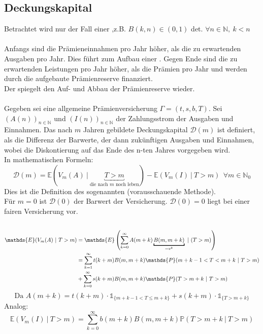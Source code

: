 \subsection{Deckungskapital}
\label{sub:deckungskapital}
Betrachtet wird nur der Fall einer ,z.B. $B(k,n) \in (0,1)$ det. $\forall n \in \mathds{N},~k<n$\\
\\
Anfangs sind die Prämieneinnahmen pro Jahr höher, als die zu erwartenden Ausgaben pro Jahr. Dies führt zum Aufbau einer . Gegen Ende sind die zu erwartenden Leistungen pro Jahr höher, als die Prämien pro Jahr und werden durch die aufgebaute Prämienreserve finanziert.\\
Der  spiegelt den Auf- und Abbau der Prämienreserve wieder.\\
\\
Gegeben sei eine allgemeine Prämienversicherung $\Gamma=(t,s,b,T)$. Sei $(A(n))_{n\in \mathds{N}}$ und $(I(n))_{n\in \mathds{N}}$ der Zahlungsstrom der Ausgaben und Einnahmen. Das nach $m$ Jahren gebildete Deckungskapital $\mathcal{D}(m)$ ist definiert, als die Differenz der Barwerte, der dann zukünftigen Ausgaben und Einnahmen, wobei die Diskontierung auf das Ende des n-ten Jahres vorgegeben wird.\\
In mathematischen Formeln: 
\[
\mathcal{D}(m)= \mathds{E}(V_m(A)~|~\underbracket{T>m}_{\text{die nach $m$ noch leben}})- \mathds{E}(V_m(I)~|~T>m) ~~ \forall m\in \mathds{N}_0 
\]
Dies ist die Definition des sogenannten  (vorausschauende Methode).\\
Für $m=0$ ist $\mathcal{D}(0)$ der Barwert der Versicherung. $\mathcal{D}(0)=0$ liegt bei einer fairen Versicherung vor.\\
\\
\begin{equation*}
\begin{aligned}
	\mathds{E}(V_m(A)~|~T>m) &= \mathds{E}\enbrace{\sum_{k=0}^{\infty}A(m+k)\underbracket{B(m,m+k)}_{=v^k}~|~(T>m)}\\
	&= \sum_{k=1}^{\infty}t(k+m)B(m,m+k) \mathds{P}(m+k-1<T<m+k~|~T>m)\\
	&+ \sum_{k=0}^{\infty}s(k+m)B(m,m+k) \mathds{P}(T>m+k~|~T>m)	
\end{aligned}
\end{equation*}
\[ \text{Da } A(m+k) = t(k+m)\cdot \mathbb{1}_{\{m+k-1<T \le m+k \}} + s(k+m)\cdot \mathbb{1}_{\{T>m+k \}}\]
Analog:
\[ \mathds{E}(V_m(I)~|~T>m)= \sum_{k=0}^{\infty}b(m+k)B(m,m+k) \mathds{P}(T>m+k~|~T>m) \]

